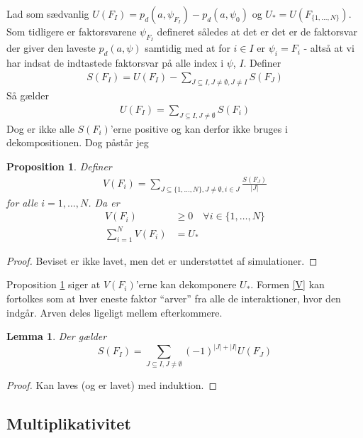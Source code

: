\documentclass[a4paper, 12pt]{article}
\newtheorem{proposition}{Proposition}
\newtheorem{lemma}{Lemma}
\begin{document}
Lad som sædvanlig $U(F_I)=p_d(a,\psi_{F_I})-p_d(a, \psi_{0})$ og $U_*=U(F_{\{1,\dots,N\}})$. Som tidligere er faktorsvarene $\psi_{F_I}$ defineret således at det er det er de faktorsvar der giver den laveste $p_d(a,\psi)$ samtidig med at for $i\in I$ er $\psi_i=F_{i}$ - altså at vi har indsat de indtastede faktorsvar på alle index i $\psi$, $I$. Definer
\begin{align*}
S(F_I)=U(F_I)-\sum_{J\subseteq I, J\neq \emptyset, J\neq I} S(F_J)
\end{align*}
Så gælder
\begin{align*}
U(F_I)=\sum_{J\subseteq I, J\neq \emptyset}S(F_i)
\end{align*}
Dog er ikke alle $S(F_i)$'erne positive og kan derfor ikke bruges i dekompositionen. Dog påstår jeg

\begin{proposition}\label{divided}
Definer
\begin{align}
V(F_i)=\sum_{J\subseteq\{1,\dots, N\}, J\neq \emptyset, i\in J} \frac{S(F_J)}{|J|}\label{V}
\end{align}
for alle $i=1, \dots, N$. Da er
\begin{align}
V(F_i)&\geq 0 \quad \forall i\in \{1, \dots, N\}\\
\sum_{i=1}^NV(F_i)&=U_*
\end{align}
\end{proposition}
\begin{proof}
Beviset er ikke lavet, men det er understøttet af simulationer. 
\end{proof}

Proposition \ref{divided} siger at $V(F_i)$'erne kan dekomponere $U_*$. Formen \eqref{V} kan fortolkes som at hver eneste faktor ``arver'' fra alle de interaktioner, hvor den indgår. Arven deles ligeligt mellem efterkommere.

\begin{lemma}\label{alternating}
Der gælder
\begin{equation}
S(F_I)=\sum_{J\subseteq I, J\neq \emptyset} (-1)^{|J|+|I|} U(F_J)
\end{equation}
\end{lemma}
\begin{proof}
Kan laves (og er lavet) med induktion. 
\end{proof}


\subsection{Multiplikativitet}
\end{document}
